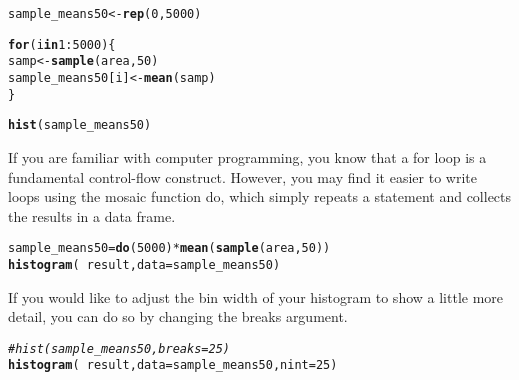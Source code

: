 \documentclass{article}\usepackage[]{graphicx}\usepackage[]{color}
\makeatletter
\newcommand{\hlnum}[1]{\textcolor[rgb]{0.686,0.059,0.569}{#1}}%
\newcommand{\hlcom}[1]{\textcolor[rgb]{0.678,0.584,0.686}{\textit{#1}}}%
\newcommand{\hlopt}[1]{\textcolor[rgb]{0,0,0}{#1}}%
\newcommand{\hlstd}[1]{\textcolor[rgb]{0.345,0.345,0.345}{#1}}%
\newcommand{\hlkwa}[1]{\textcolor[rgb]{0.161,0.373,0.58}{\textbf{#1}}}%
\newcommand{\hlkwb}[1]{\textcolor[rgb]{0.69,0.353,0.396}{#1}}%
\newcommand{\hlkwc}[1]{\textcolor[rgb]{0.333,0.667,0.333}{#1}}%
\newcommand{\hlkwd}[1]{\textcolor[rgb]{0.737,0.353,0.396}{\textbf{#1}}}%
\newenvironment{kframe}{%
 \def\at@end@of@kframe{}%
 \ifinner\ifhmode%
  \def\at@end@of@kframe{\end{minipage}}%
  \begin{minipage}{\columnwidth}%
 \fi\fi%
 \def\FrameCommand##1{\hskip\@totalleftmargin \hskip-\fboxsep
 \colorbox{shadecolor}{##1}\hskip-\fboxsep
     \hskip-\linewidth \hskip-\@totalleftmargin \hskip\columnwidth}%
 \MakeFramed {\advance\hsize-\width
   \@totalleftmargin\z@ \linewidth\hsize
   \@setminipage}}%
 {\par\unskip\endMakeFramed%
 \at@end@of@kframe}
\newenvironment{knitrout}{}{} %
\makeatother
\begin{document}
\begin{knitrout}
\color{fgcolor}\begin{kframe}
\begin{alltt}
\hlstd{sample_means50} \hlkwb{<-} \hlkwd{rep}\hlstd{(}\hlnum{0}\hlstd{,} \hlnum{5000}\hlstd{)}

\hlkwa{for} \hlstd{(i} \hlkwa{in} \hlnum{1}\hlopt{:}\hlnum{5000}\hlstd{) \{}
    \hlstd{samp} \hlkwb{<-} \hlkwd{sample}\hlstd{(area,} \hlnum{50}\hlstd{)}
    \hlstd{sample_means50[i]} \hlkwb{<-} \hlkwd{mean}\hlstd{(samp)}
\hlstd{\}}

\hlkwd{hist}\hlstd{(sample_means50)}
\end{alltt}
\end{kframe}
\end{knitrout}


If you are familiar with computer programming, you know that a \hlnum{for} loop is a fundamental control-flow construct. However, you may find it easier to write loops using the \hlnum{mosaic} function \hlnum{do}, which simply repeats a statement and collects the results in a data frame. 

\begin{knitrout}
\color{fgcolor}\begin{kframe}
\begin{alltt}
\hlstd{sample_means50} \hlkwb{=} \hlkwd{do}\hlstd{(}\hlnum{5000}\hlstd{)} \hlopt{*} \hlkwd{mean}\hlstd{(}\hlkwd{sample}\hlstd{(area,} \hlnum{50}\hlstd{))}
\hlkwd{histogram}\hlstd{(}\hlopt{~}\hlstd{result,} \hlkwc{data} \hlstd{= sample_means50)}
\end{alltt}
\end{kframe}
\end{knitrout}




If you would like to adjust the bin width of your histogram to show a little more detail, you can do so by changing the \hlkwc{breaks} argument.

\begin{knitrout}
\color{fgcolor}\begin{kframe}
\begin{alltt}
\hlcom{# hist(sample_means50, breaks = 25)}
\hlkwd{histogram}\hlstd{(}\hlopt{~}\hlstd{result,} \hlkwc{data} \hlstd{= sample_means50,} \hlkwc{nint} \hlstd{=} \hlnum{25}\hlstd{)}
\end{alltt}
\end{kframe}
\end{knitrout}
\end{document}
